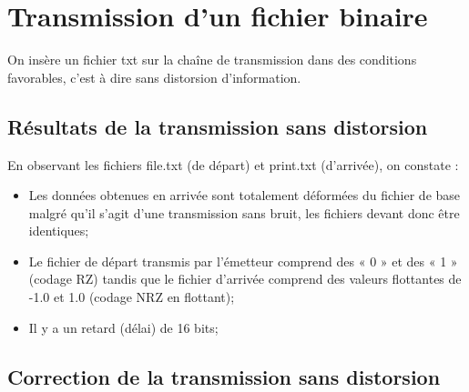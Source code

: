 \chapter{Transmission d'un fichier binaire}
\minitoc
On insère un fichier txt sur la chaîne de transmission dans des conditions favorables, c'est à dire sans distorsion d'information.

\section{Résultats de la transmission sans distorsion}
En observant les fichiers file.txt (de  départ) et print.txt (d’arrivée), on constate :


\begin{itemize}
\item Les données obtenues en arrivée sont totalement déformées du fichier de base malgré qu'il s'agit d'une transmission sans bruit, les fichiers devant donc être identiques;
\item Le fichier de départ transmis par l'émetteur comprend des « 0 » et des « 1 » (codage RZ) tandis que le fichier d'arrivée comprend des valeurs flottantes de -1.0 et 1.0 (codage NRZ en flottant);
\item Il y a un retard (délai) de 16 bits;

\end{itemize}

\section{Correction de la transmission sans distorsion}
